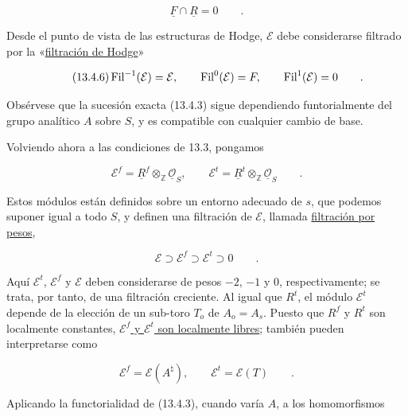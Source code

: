 \begin{equation}\tag{13.4.5}
 \underline F\cap\underline R=0\qquad .
\end{equation}

\noindent
Desde el punto de vista de las estructuras de Hodge, $\mathcal E$ debe
considerarse filtrado por la «\underline{filtración de Hodge}»

\begin{equation}\tag{13.4.6}
 \operatorname{Fil}^{\sisi{1}{-1}}(\mathcal E)=\mathcal E,
 \qquad \operatorname{Fil}^{0}(\mathcal E)=\underline F,
 \qquad \operatorname{Fil}^{\sisi{-1}{1}}(\mathcal E)=0\qquad .
\end{equation}

\noindent
Obsérvese que la sucesión exacta (13.4.3) sigue dependiendo
funtorialmente del grupo analítico $A$ sobre $S$, y es compatible con
cualquier cambio de base.

Volviendo ahora a las condiciones de 13.3, pongamos

\begin{equation}\tag{13.4.7}
 \mathcal E^f=\underline R^f\otimes_{\mathbb Z}
 \underline{\mathcal O}_S,
 \qquad
 \mathcal E^t=\underline R^t\otimes_{\mathbb Z}
 \underline{\mathcal O}_S\qquad .
\end{equation}

\noindent
Estos módulos están definidos sobre un entorno adecuado de $s$, que
podemos suponer igual a todo $S$, y definen una filtración de
$\mathcal E$, llamada \underline{filtración por pesos},

\begin{equation}\tag{13.4.8}
 \mathcal E\supset\mathcal E^f\supset\mathcal E^t\supset0\qquad .
\end{equation}

\noindent
Aquí $\mathcal E^t$, $\mathcal E^f$ y $\mathcal E$ deben considerarse
de pesos $-2$, $-1$ y $0$, respectivamente; se trata, por tanto, de una
filtración creciente. Al igual que $R^t$, el módulo $\mathcal E^t$
depende de la elección de un sub-toro $T_o$ de $A_o=A_s$. Puesto que
$R^f$ y $R^t$ son localmente constantes, \underline{$\mathcal E^f$ y
$\mathcal E^t$ son localmente libres}; también pueden interpretarse
como

\begin{equation}\tag{13.4.9}
 \mathcal E^f=\mathcal E(A^\natural),
 \qquad \mathcal E^t=\mathcal E(T)\qquad .
\end{equation}

\noindent
Aplicando la functorialidad de (13.4.3), cuando varía $A$, a los
homomorfismos

